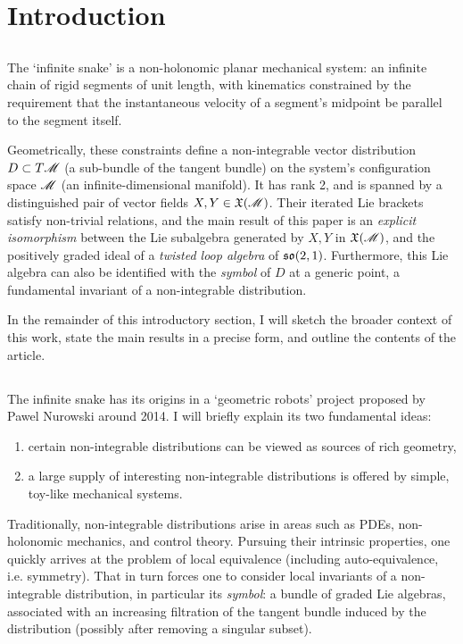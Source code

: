 \section{Introduction}
\subsection*{}
The `infinite snake' is a non-holonomic planar mechanical system:
an infinite chain of rigid segments of unit length, with kinematics
constrained by the requirement that the instantaneous velocity of
a segment's midpoint be parallel to the segment itself.

Geometrically, these constraints define a non-integrable vector distribution $D \subset T\mathscr{M}$ (a
sub-bundle of the tangent bundle) on the system's configuration space $\mathscr{M}$ (an infinite-dimensional
manifold). It has rank 2, and is spanned by a distinguished pair of vector fields $X,Y \in \mathfrak{X}(\mathscr{M})$. 
Their iterated Lie brackets satisfy non-trivial relations, and the main result of this paper is
an \emph{explicit isomorphism} between the Lie subalgebra generated by $X,Y$ in $\mathfrak{X}(\mathscr{M})$, and
the positively graded ideal of a \emph{twisted loop algebra} of
$\mathfrak{so}(2,1)$.
Furthermore, this Lie algebra can also be identified with the \emph{symbol} of $D$ at a generic point,
a fundamental invariant of a non-integrable distribution.

In the remainder of this introductory section, I will sketch the broader context of this work,
state the main results in a precise form, and outline the contents of the article.

\subsection{}
The infinite snake has its origins in a `geometric robots' project proposed by Pawel Nurowski around 2014.
I will briefly explain its two fundamental ideas:
\begin{enumerate}
        \item certain non-integrable distributions can be viewed as sources of rich geometry, 
        \item a large supply of interesting non-integrable distributions is offered
              by simple, toy-like mechanical systems.
\end{enumerate}

Traditionally, non-integrable distributions arise in areas such as \textsc{PDE}s, non-holonomic mechanics,
and control theory. Pursuing their intrinsic properties, one quickly arrives at the problem of local 
equivalence (including auto-equivalence, i.e. symmetry).
That in turn forces one to consider local invariants of a non-integrable distribution, in particular 
its \emph{symbol}:
a bundle of graded Lie algebras, associated with an increasing 
filtration of the tangent bundle induced by the
distribution (possibly after removing a singular subset). 

